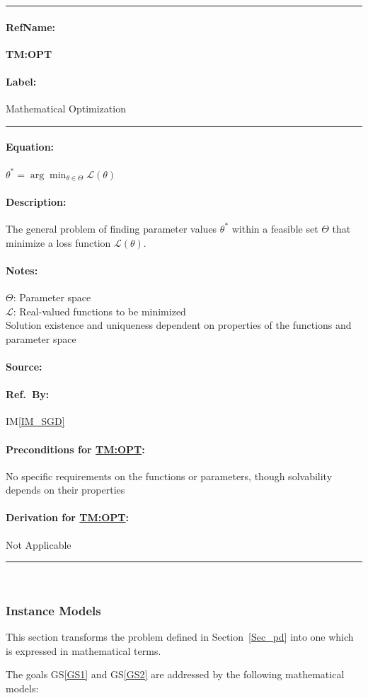 \documentclass[12pt]{article}
\newcommand{\gsref}[1]{GS\ref{#1}}
\newcommand{\iref}[1]{IM\ref{#1}}
\newcommand{\deftheory}[9][Not Applicable]
{
\newpage
\noindent \rule{\textwidth}{0.5mm}

\paragraph{RefName: } \textbf{#2} \phantomsection 
\label{#2}

\paragraph{Label:} #3

\noindent \rule{\textwidth}{0.5mm}

\paragraph{Equation:}

#4

\paragraph{Description:}

#5

\paragraph{Notes:}

#6

\paragraph{Source:}

#7

\paragraph{Ref.\ By:}

#8

\paragraph{Preconditions for \hyperref[#2]{#2}:}
\label{#2_precond}

#9

\paragraph{Derivation for \hyperref[#2]{#2}:}
\label{#2_deriv}

#1

\noindent \rule{\textwidth}{0.5mm}

}
\begin{document}
\deftheory
{TM:OPT}
{Mathematical Optimization}
{
$\displaystyle \theta^* = \arg\min_{\theta \in \Theta} \mathcal{L}(\theta)$ 
}
{
  The general problem of finding parameter values $\theta^*$ within a feasible set $\Theta$ that minimize a loss function $\mathcal{L}(\theta)$.
}
{
$\Theta$: Parameter space\\
$\mathcal{L}$: Real-valued functions to be minimized\\
Solution existence and uniqueness dependent on properties of the functions and parameter space
}
{
  \cite{wiki:Gradient_descent}
}
{
  \iref{IM_SGD}
}
{
  No specific requirements on the functions or parameters, though solvability depends on their properties
}
{}

~\newline

\subsubsection{Instance Models} \label{sec_instance}    

This section transforms the problem defined in Section~\ref{Sec_pd} into 
one which is expressed in mathematical terms. 

The goals \gsref{GS1} and \gsref{GS2} are addressed by the following mathematical models:

~\newline

\end{document}
